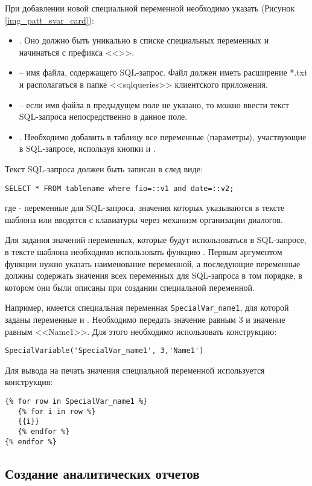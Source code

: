 При добавлении новой специальной переменной необходимо указать (Рисунок \ref{img_patt_svar_card}):
\begin{itemize}
 \item {}. Оно должно быть уникально в списке специальных переменных и начинаться с префикса <<>>.
 \item {} – имя файла, содержащего SQL-запрос. Файл должен иметь расширение *.txt и располагаться в папке <<sqlqueries>> клиентского приложения.
 \item {} – если имя файла в предыдущем поле не указано, то можно ввести текст SQL-запроса непосредственно в данное поле.
 \item {}. Необходимо добавить в таблицу все переменные (параметры), участвующие в SQL-запросе, используя кнопки  и  .
\end{itemize}

Текст SQL-запроса должен быть записан в след виде:

\verb|SELECT * FROM tablename where fio=::v1 and date=::v2;|

где  - переменные для SQL-запроса, значения которых указываются в тексте шаблона или вводятся с клавиатуры через механизм организации диалогов.

Для задания значений переменных, которые будут использоваться в SQL-запросе, в тексте шаблона необходимо использовать функцию . Первым аргументом функции нужно указать наименование переменной, а последующие переменные должны содержать значения всех переменных для SQL-запроса в том порядке, в котором они были описаны при создании специальной переменной.

Например, имеется специальная переменная \verb|SpecialVar_name1|, для которой заданы переменные  и . Необходимо передать значение  равным 3 и значение  равным <<Name1>>. Для этого необходимо использовать конструкцию:

\verb|SpecialVariable('SpecialVar_name1', 3,'Name1')|

Для вывода на печать значения специальной переменной используется конструкция:
\begin{verbatim}
{% for row in SpecialVar_name1 %}
   {% for i in row %}
   {{i}}
   {% endfor %}
{% endfor %}
\end{verbatim}

\subsection{Создание аналитических отчетов}

